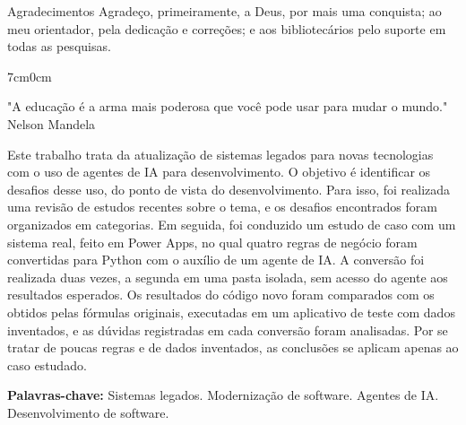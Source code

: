 \documentclass[
	12pt,	
    oneside,
    a4paper,
    brazil  
]{abntex2}
\begin{document}
\newpage
\begin{agradecimento}{Agradecimentos}
Agradeço, primeiramente, a Deus, por mais uma conquista; ao meu orientador, pela dedicação e correções; e aos bibliotecários pelo suporte em todas as pesquisas.

\end{agradecimento}


\newpage
\begin{adjustwidth}{7cm}{0cm}
\vspace*{\fill}
\begin{flushright}
"A educação é a arma mais poderosa que você pode usar para mudar o mundo." \\
\vspace*{10pt}
Nelson Mandela
\end{flushright}
\end{adjustwidth}


\newpage
\begin{resumo2}
Este trabalho trata da atualização de sistemas legados para novas tecnologias com o uso de agentes de IA para desenvolvimento. O objetivo é identificar os desafios desse uso, do ponto de vista do desenvolvimento. Para isso, foi realizada uma revisão de estudos recentes sobre o tema, e os desafios encontrados foram organizados em categorias. Em seguida, foi conduzido um estudo de caso com um sistema real, feito em Power Apps, no qual quatro regras de negócio foram convertidas para Python com o auxílio de um agente de IA. A conversão foi realizada duas vezes, a segunda em uma pasta isolada, sem acesso do agente aos resultados esperados. Os resultados do código novo foram comparados com os obtidos pelas fórmulas originais, executadas em um aplicativo de teste com dados inventados, e as dúvidas registradas em cada conversão foram analisadas. Por se tratar de poucas regras e de dados inventados, as conclusões se aplicam apenas ao caso estudado.

\vspace*{20pt}
\textbf{Palavras-chave:} Sistemas legados. Modernização de software. Agentes de IA. Desenvolvimento de software.
\end{resumo2}
\end{document}
